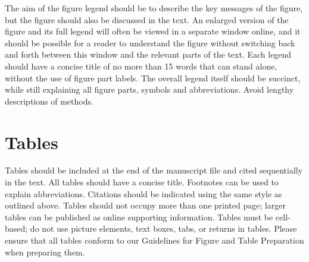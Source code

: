\documentclass[10pt]{article}
\begin{document}
The aim of the figure legend should be to describe the key messages of the figure, but 
the figure should also be discussed in the text. An enlarged version of the figure and its full legend 
will often be viewed in a separate window online, and it should be possible for a reader to understand the figure 
without switching back and forth between this window and the relevant parts of the text. Each legend should have 
a concise title of no more than 15 words that can stand alone, without the use of figure part labels. The overall 
legend itself should be succinct, while still explaining all figure parts, symbols and abbreviations. Avoid lengthy descriptions of methods.

\section*{Tables}

Tables should be included at the end of the manuscript file and cited sequentially in the text. 
All tables should have a concise title. Footnotes can be used to explain abbreviations. 
Citations should be indicated using the same style as outlined above. Tables should not occupy more than one 
printed page; larger tables can be published as online supporting information. Tables must be cell-based; 
do not use picture elements, text boxes, tabs, or returns in tables. Please ensure that all tables conform to our 
Guidelines for Figure and Table Preparation when preparing them.
\end{document}

